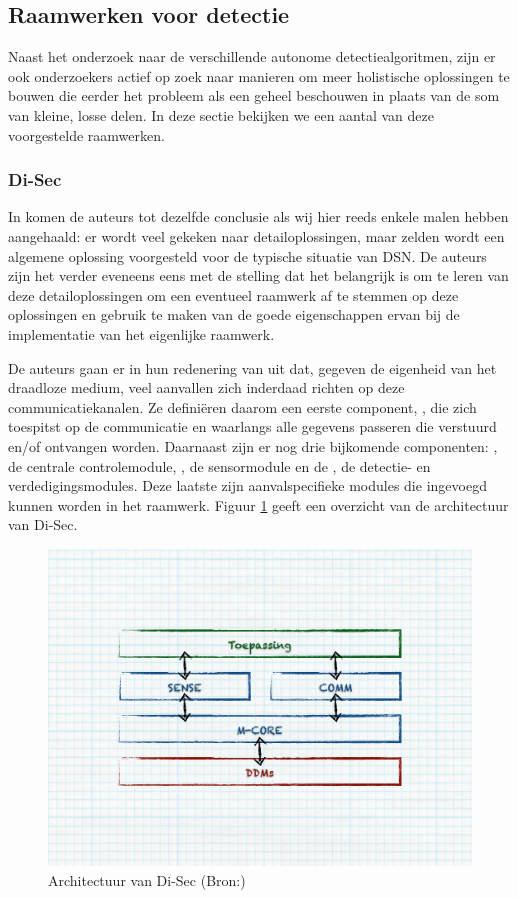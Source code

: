 
\subsection{Raamwerken voor detectie}
\label{subsection:frameworks}

Naast het onderzoek naar de verschillende autonome detectiealgoritmen, zijn er
ook onderzoekers actief op zoek naar manieren om meer holistische oplossingen
te bouwen die eerder het probleem als een geheel beschouwen in plaats van de
som van kleine, losse delen. In deze sectie bekijken we een aantal van deze
voorgestelde raamwerken.

\subsubsection*{Di-Sec}
\label{subsubsection:di-sec}

In \citep{valero2012di} komen de auteurs tot dezelfde conclusie als wij hier
reeds enkele malen hebben aangehaald: er wordt veel gekeken naar
detailoplossingen, maar zelden wordt een algemene oplossing voorgesteld voor de
typische situatie van DSN. De auteurs zijn het verder eveneens eens met de
stelling dat het belangrijk is om te leren van deze detailoplossingen om een
eventueel raamwerk af te stemmen op deze oplossingen en gebruik te maken van de
goede eigenschappen ervan bij de implementatie van het eigenlijke raamwerk.

De auteurs gaan er in hun redenering van uit dat, gegeven de eigenheid van het
draadloze medium, veel aanvallen zich inderdaad richten op deze
communicatiekanalen. Ze defini\"eren daarom een eerste component, ,
die zich toespitst op de communicatie en waarlangs alle gegevens passeren die
verstuurd en/of ontvangen worden. Daarnaast zijn er nog drie bijkomende
componenten: , de centrale controlemodule, , de
sensormodule en de , de detectie- en verdedigingsmodules. Deze
laatste zijn aanvalspecifieke modules die ingevoegd kunnen worden in het
raamwerk. Figuur \ref{fig:di-sec-architecture} geeft een overzicht van de
architectuur van Di-Sec.

\begin{figure}[ht]
  \centering
  \includegraphics[width=0.8\linewidth]{resources/di-sec-architecture.pdf}
  \caption[Architectuur van Di-Sec]{Architectuur van Di-Sec (Bron:\citep{valero2012di})}
  \label{fig:di-sec-architecture}
\end{figure}

